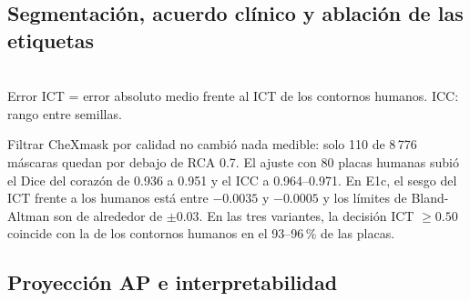 \documentclass[conference]{IEEEtran}
\begin{document}
\subsection{Segmentación, acuerdo clínico y ablación de las etiquetas}

\begin{table}[t]
\caption{Segmentación y acuerdo del ICT en la prueba dorada SCR (147 placas; 3 semillas)}\label{tab:e1}
\centering
\setlength{\tabcolsep}{3pt}
\\[2pt]{\footnotesize Error ICT = error absoluto medio frente al ICT de los contornos humanos. ICC: rango entre semillas.}
\end{table}

Filtrar CheXmask por calidad no cambió nada medible: solo 110 de 8\,776 máscaras quedan por debajo de RCA 0.7. El
ajuste con 80 placas humanas subió el Dice del corazón de 0.936 a 0.951 y el ICC a 0.964--0.971. En E1c, el sesgo del
ICT frente a los humanos está entre $-0.0035$ y $-0.0005$ y los límites de Bland-Altman son de alrededor de
$\pm0.03$. En las tres variantes, la decisión ICT $\geq 0.50$ coincide con la de los contornos humanos en el
93--96\,\% de las placas.

\subsection{Proyección AP e interpretabilidad}
\end{document}
